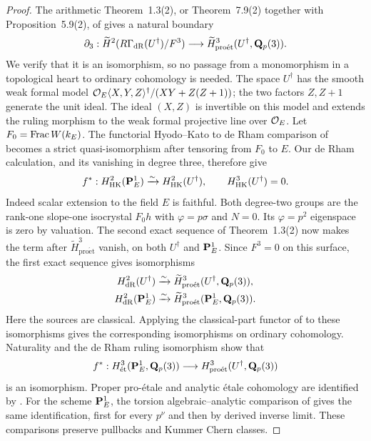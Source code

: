 \begin{proof}
The arithmetic Theorem~1.3(2), or Theorem~7.9(2) together with Proposition~5.9(2), of \cite{ColmezNiziol} gives a natural boundary
\[
\partial_3:\widetilde H^2(R\Gamma_{\mathrm{dR}}(U^\dagger)/F^3)
\longrightarrow\widetilde H^3_{\mathrm{pro\acute et}}(U^\dagger,\mathbf Q_p(3)).
\]
We verify that it is an isomorphism, so no passage from a monomorphism in a topological heart to ordinary cohomology is needed. The space $U^\dagger$ has the smooth weak formal model
$\mathcal O_E\langle X,Y,Z\rangle^\dagger/(XY+Z(Z+1))$; the two factors $Z,Z+1$ generate the unit ideal. The ideal $(X,Z)$ is invertible on this model and extends the ruling morphism to the weak formal projective line over $\mathcal O_E$. Let $F_0=\operatorname{Frac} W(k_E)$. The functorial Hyodo--Kato to de Rham comparison of \cite[equation~(5.4) and Propositions~5.5--5.6]{ColmezNiziol} becomes a strict quasi-isomorphism after tensoring from $F_0$ to $E$. Our de Rham calculation, and its vanishing in degree three, therefore give
\[
f^*:H^2_{\mathrm{HK}}(\mathbf P^1_E)\xrightarrow{\sim}H^2_{\mathrm{HK}}(U^\dagger),
\qquad H^3_{\mathrm{HK}}(U^\dagger)=0.
\]
Indeed scalar extension to the field $E$ is faithful. Both degree-two groups are the rank-one slope-one isocrystal $F_0h$ with $\varphi=p\sigma$ and $N=0$. Its $\varphi=p^2$ eigenspace is zero by valuation. The second exact sequence of Theorem~1.3(2) now makes the term after $\widetilde H^3_{\mathrm{pro\acute et}}$ vanish, on both $U^\dagger$ and $\mathbf P^1_E$. Since $F^3=0$ on this surface, the first exact sequence gives isomorphisms
\begin{align*}
H^2_{\mathrm{dR}}(U^\dagger)&\xrightarrow{\sim}\widetilde H^3_{\mathrm{pro\acute et}}(U^\dagger,\mathbf Q_p(3)),\\
H^2_{\mathrm{dR}}(\mathbf P^1_E)&\xrightarrow{\sim}\widetilde H^3_{\mathrm{pro\acute et}}(\mathbf P^1_E,\mathbf Q_p(3)).
\end{align*}
Here the sources are classical. Applying the classical-part functor of \cite[Section~3.1.1]{ColmezNiziol} to these isomorphisms gives the corresponding isomorphisms on ordinary cohomology. Naturality and the de Rham ruling isomorphism show that
\[
f^*:H^3_{\mathrm{\acute et}}(\mathbf P^1_E,\mathbf Q_p(3))
\longrightarrow H^3_{\mathrm{pro\acute et}}(U^\dagger,\mathbf Q_p(3))
\]
is an isomorphism. Proper pro-\'etale and analytic \'etale cohomology
are identified by \cite[Section~7.2.4]{ColmezNiziol}. For the scheme
$\mathbf P^1_E$, the torsion algebraic--analytic comparison of
\cite[Theorem~6.1.1]{BerkovichEtale} gives the same identification,
first for every $p^\nu$ and then by derived inverse limit.
These comparisons preserve pullbacks and Kummer Chern classes.

\end{proof}
